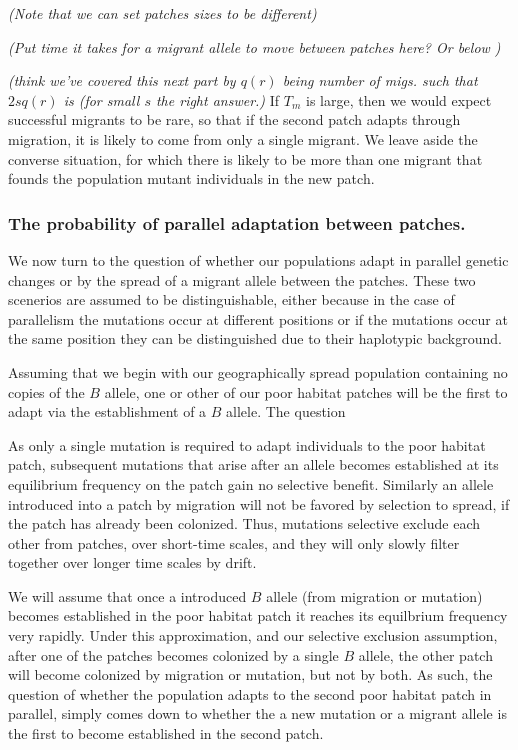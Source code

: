 \documentclass{article}
\newcommand{\gc}[1]{{ \it \color{green} (#1) } }
\begin{document}
\gc{Note that we can set patches sizes to be different}

\gc{Put time it takes for a migrant allele to move between patches
  here? Or below }

\gc{think we've covered this next part by $q(r)$ being number of migs. such
that $2sq(r)$ is (for small $s$ the right answer.}
If $T_m$ is large, then we would expect successful migrants to be rare,
so that if the second patch adapts through migration, it is likely to come from only a single migrant.
We leave aside the converse situation, for which there is likely to be more than one migrant
that founds the population mutant individuals in the new patch.


\subsubsection{The probability of parallel adaptation between patches.} 
\label{ss:probparallel}
We now turn to the question of whether our populations adapt in
parallel genetic changes or by the spread of a migrant allele between the
patches. These two scenerios are assumed to be distinguishable, either
because in the case of parallelism the mutations occur at different
positions or if the mutations occur at the same position they can be
distinguished due to their haplotypic background. 

Assuming that we begin with our geographically 
spread population containing no copies of the $B$ allele, one or other
of our poor habitat patches will be the first to adapt via the
establishment of a $B$ allele. The question 

As only a single mutation is required to adapt individuals to the
poor habitat patch, subsequent mutations that arise after an allele
becomes established at its equilibrium frequency on the patch gain no selective
benefit. Similarly an allele introduced into a patch by migration will
not be favored by selection to spread, if the patch has already been
colonized. Thus, mutations selective exclude each other from
patches, over short-time scales, and they will only slowly filter
together over longer time scales by drift. 

We will assume that once a introduced $B$ allele (from migration or mutation) becomes
established in the poor habitat patch it reaches its equilbrium
frequency very rapidly. Under this approximation, and our selective
exclusion assumption, after one of the patches becomes colonized by a
single $B$ allele, the other patch will become colonized by migration or
mutation, but not by both. As such, the question of whether the
population adapts to the second poor habitat patch in parallel, simply comes down to whether the a new mutation or a migrant allele
is the first to become established in the second patch. 
\end{document}

